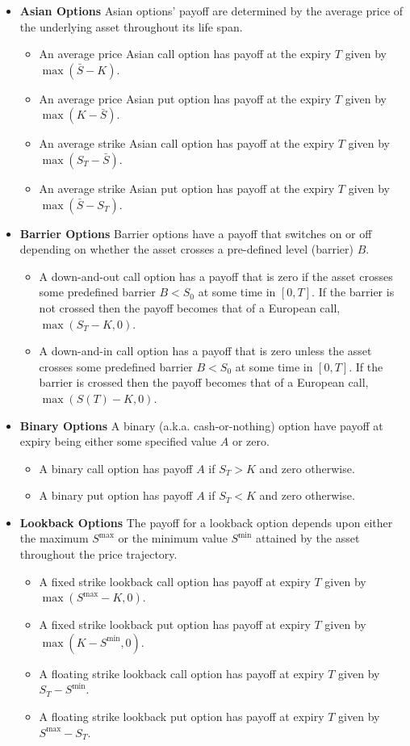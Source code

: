 \begin{itemize} \label{lst:exotic_options}
    \item \textbf{Asian Options} Asian options' payoff are determined by the average price of the underlying asset throughout its life span.
    \begin{itemize}
		\item An average price Asian call option has payoff at the expiry $T$ given by $\max(\bar{S} - K)$.
		\item An average price Asian put option has payoff at the expiry $T$ given by $\max(K - \bar{S})$.
		\item An average strike Asian call option has payoff at the expiry $T$ given by $\max(S_T - \bar{S})$.
		\item An average strike Asian put option has payoff at the expiry $T$ given by $\max(\bar{S} - S_T)$.
	\end{itemize}
    \item \textbf{Barrier Options} Barrier options have a payoff that switches on or off depending on whether the asset crosses a pre-defined level (barrier) $B$.
    \begin{itemize}
		\item A down-and-out call option has a payoff that is zero if the asset crosses some predefined barrier $B<S_0$ at some time in $[0, T]$. If the barrier is not crossed then the payoff becomes that of a European call, $\max(S_T - K, 0)$.
		\item A down-and-in call option has a payoff that is zero unless the asset crosses some predefined barrier $B<S_0$ at some time in $[0, T]$. If the barrier is crossed then the payoff becomes that of a European call, $\max(S(T) - K, 0)$.
    \end{itemize}
    \item \textbf{Binary Options} A binary (a.k.a. cash-or-nothing) option have payoff at expiry being either some specified value $A$ or zero.
    \begin{itemize}
		\item A binary call option has payoff $A$ if $S_T>K$ and zero otherwise.
		\item A binary put option has payoff $A$ if $S_T<K$ and zero otherwise.
	\end{itemize}
    \item \textbf{Lookback Options} The payoff for a lookback option depends upon either the maximum $S^{\max}$ or the minimum value $S^{\min}$ attained by the asset throughout the price trajectory.
    \begin{itemize}
		\item A fixed strike lookback call option has payoff at expiry $T$ given by $\max(S^{\max}-K, 0)$.
		\item A fixed strike lookback put option has payoff at expiry $T$ given by $\max(K-S^{\min}, 0)$.
		\item A floating strike lookback call option has payoff at expiry $T$ given by $S_T -S^{\min}$.
		\item A floating strike lookback put option has payoff at expiry $T$ given by $S^{\max} -S_T$.
    \end{itemize}
\end{itemize}

